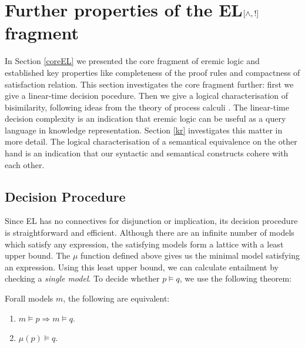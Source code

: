 \section{Further properties of the EL$[\land, !]$ fragment}

In Section \ref{coreEL} we presented the core fragment of eremic logic
and established key properties like completeness of the proof rules
and compactness of satisfaction relation. This section investigates
the core fragment further: first we give a linear-time decision
pocedure. Then we give a logical characterisation of bisimilarity,
following ideas from the theory of process calculi
\cite{HennessyM:alglawfndac}.  The linear-time decision complexity is
an indication that eremic logic can be useful as a query language in
knowledge representation. Section \ref{kr} investigates this matter in
more detail. The logical characterisation of a semantical equivalence
on the other hand is an indication that our syntactic and semantical
constructs cohere with each other.

\subsection{Decision Procedure}

\NI Since EL has no connectives for disjunction or implication, its
decision procedure is straightforward and efficient.  Although there
are an infinite number of models which satisfy any expression, the
satisfying models form a lattice with a least upper bound.  The $\mu$
function defined above gives us the minimal model satisfying an
expression.  Using this least upper bound, we can calculate entailment
by checking a \emph{single model}.  To decide whether $p \models q$,
we use the following theorem:

\begin{theorem}\label{theorem:decision}
  Forall models $m$, the following are equivalent:
  \begin{enumerate}
    \item\label{theorem:decision:1} $m \models p \Rightarrow m \models q$.
    \item\label{theorem:decision:2} $\mu(p) \models q$.
  \end{enumerate}
\end{theorem}

